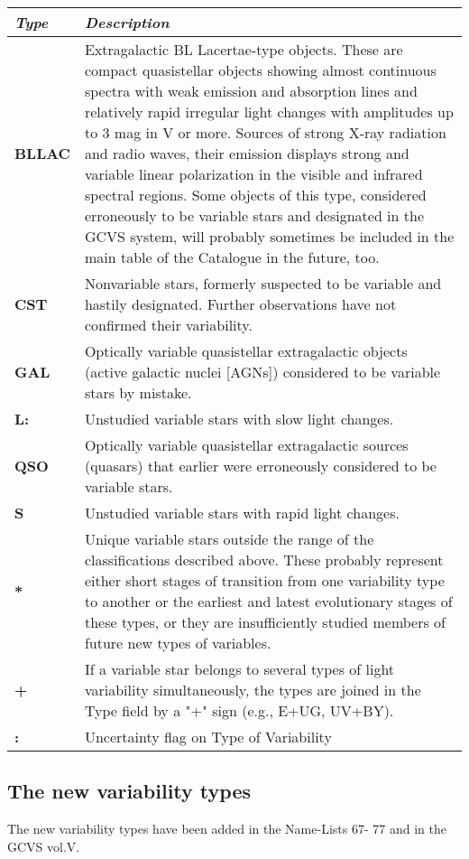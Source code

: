 \begin{longtabu} to \textwidth {l|X}
\toprule
\emph{Type} & \emph{Description}\tabularnewline
\midrule
\textbf{BLLAC} & Extragalactic BL Lacertae-type objects. These are
compact quasistellar objects showing almost continuous spectra with weak
emission and absorption lines and relatively rapid irregular light
changes with amplitudes up to 3 mag in V or more. Sources of strong
X-ray radiation and radio waves, their emission displays strong and
variable linear polarization in the visible and infrared spectral
regions. Some objects of this type, considered erroneously to be
variable stars and designated in the GCVS system, will probably
sometimes be included in the main table of the Catalogue in the future,
too.\tabularnewline
\textbf{CST} & Nonvariable stars, formerly suspected to be variable and
hastily designated. Further observations have not confirmed their
variability.\tabularnewline
\textbf{GAL} & Optically variable quasistellar extragalactic objects
(active galactic nuclei {[}AGNs{]}) considered to be variable stars by
mistake.\tabularnewline
\textbf{L:} & Unstudied variable stars with slow light
changes.\tabularnewline
\textbf{QSO} & Optically variable quasistellar extragalactic sources
(quasars) that earlier were erroneously considered to be variable
stars.\tabularnewline
\textbf{S} & Unstudied variable stars with rapid light
changes.\tabularnewline
\textbf{*} & Unique variable stars outside the range of the
classifications described above. These probably represent either short
stages of transition from one variability type to another or the
earliest and latest evolutionary stages of these types, or they are
insufficiently studied members of future new types of
variables.\tabularnewline
\textbf{+} & If a variable star belongs to several types of light
variability simultaneously, the types are joined in the Type field by a
"+" sign (e.g., E+UG, UV+BY).\tabularnewline
\textbf{:} & Uncertainty flag on Type of Variability\tabularnewline
\bottomrule
\end{longtabu}

\subsection{The new variability types}\label{the-new-variability-types}

The new variability types have been added in the Name-Lists 67- 77 and
in the GCVS vol.V.

